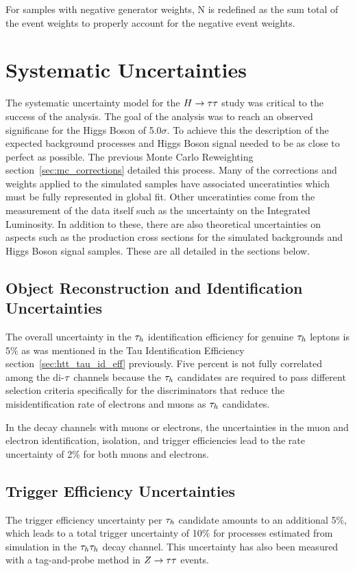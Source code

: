 For samples with negative generator weights, N is redefined as the sum total of the event weights to
properly account for the negative event weights.




\section{Systematic Uncertainties}
\label{sec:htt_systematics}

The systematic uncertainty model for the $H\to\tau\tau$ study was critical to the success of the analysis.
The goal of the analysis was to reach an observed significane for the Higgs Boson of 5.0$\sigma$.
To achieve this the description of the expected background processes and Higgs Boson signal
needed to be as close to perfect as possible. The previous Monte Carlo Reweighting 
section~\ref{sec:mc_corrections} detailed this process. Many of the corrections and weights applied
to the simulated samples have associated unceratinties which must be fully represented in 
global fit. Other unceratinties come from the measurement of the data itself such as the uncertainty
on the Integrated Luminosity. In addition to these, there are also theoretical uncertainties on
aspects such as the production cross sections for the simulated backgrounds and Higgs Boson signal
samples. These are all detailed in the sections below.


\subsection{Object Reconstruction and Identification Uncertainties}
The overall uncertainty in the $\tau_{h}$ identification efficiency for genuine $\tau_{h}$ leptons is 5\%
as was mentioned in the Tau Identification Efficiency section~\ref{sec:htt_tau_id_eff} previously.
Five percent is not fully correlated among the di-$\tau$ channels because the $\tau_{h}$ candidates 
are required to pass different selection criteria specifically for the discriminators that reduce 
the misidentification rate of electrons and muons as $\tau_{h}$ candidates.

In the decay channels with muons or electrons, the uncertainties in the muon and electron identification, isolation, and 
trigger efficiencies lead to the rate uncertainty of 2\% for both muons and electrons.


\subsection{Trigger Efficiency Uncertainties}
The trigger efficiency uncertainty per $\tau_{h}$ candidate amounts to an additional 5\%, which leads to a total 
trigger uncertainty of 10\% for processes estimated from simulation in the $\tau_{h}\tau_{h}$ decay channel. This 
uncertainty has also been measured with a tag-and-probe method in $Z\to\tau\tau$ events.


